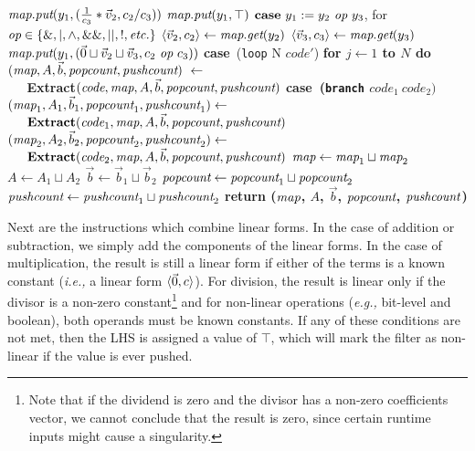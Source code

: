\documentclass{sig-alternate}
\begin{document}
\begin{algorithm}
\begin{algorithmic}
\IND
\STATE $\mbox{\it map}.\mbox{\it put}(y_1, (\frac{1}{c_3}*\vec v_2, c_2/c_3))$
\UND
{}
\IND
\STATE $\mbox{\it map}.\mbox{\it put}(y_1, \top)$
\UND
\UND
\STATE \vspace{-6pt}
\STATE $\mbox{\bf case}~y_1 := y_2 ~\mbox{\it op}~ y_3$, for $\mbox{\it op} \in \{\&, |, \wedge, \&\&, ||, !, \mbox{\it etc.}\}$
\IND
\STATE $\langle{\vec v_2}, {c_2}\rangle \leftarrow \mbox{\it map}.\mbox{\it get}(y_2)$
\STATE $\langle{\vec v_3}, {c_3}\rangle \leftarrow \mbox{\it map}.\mbox{\it get}(y_3)$
\STATE $\mbox{\it map}.\mbox{\it put}(y_1, (\vec 0 \sqcup \vec v_2 \sqcup \vec v_3, c_2 ~\mbox{\it op}~ c_3))$
\UND
\STATE \vspace{-6pt}
\STATE \mbox{\bf case}~({\tt loop} N $code'$)
\IND
\STATE \bf{for} $j \leftarrow 1$ to $N$ {\bf do}
\IND
\STATE $(\mbox{\it map}, A, {\vec b}, \mbox{\it popcount}, \mbox{\it pushcount})~\leftarrow~$ \\
\verb+   +\bf{Extract}$(\mbox{\it code}, \mbox{\it map}, A, {\vec b}, \mbox{\it popcount}, \mbox{\it pushcount})$
\UND
\UND
\STATE \vspace{-6pt}
\STATE \mbox{\bf case}~({\tt branch} $code_1~code_2)$
\IND
\STATE $(\mbox{\it map}_1, A_1, {\vec b_1}, \mbox{\it popcount}_1, \mbox{\it pushcount}_1) \leftarrow$ \\
\verb+   +${\mbox{\bf Extract}}(\mbox{\it code}_1, \mbox{\it map}, A, {\vec b}, \mbox{\it popcount}, \mbox{\it pushcount})$
\STATE $(\mbox{\it map}_2, A_2, {\vec b_2}, \mbox{\it popcount}_2, \mbox{\it pushcount}_2) \leftarrow$ \\ 
\verb+   +${\mbox{\bf Extract}}(\mbox{\it code}_2, \mbox{\it map}, A, {\vec b}, \mbox{\it popcount}, \mbox{\it pushcount})$
\STATE $\mbox{\it map} \leftarrow \mbox{\it map}_1 \sqcup \mbox{\it map}_2$
\STATE $A \leftarrow A_1 \sqcup A_2$
\STATE ${\vec b} \leftarrow {\vec b_1} \sqcup {\vec b_2}$
\STATE $\mbox{\it popcount} \leftarrow \mbox{\it popcount}_1 \sqcup \mbox{\it popcount}_2$
\STATE $\mbox{\it pushcount} \leftarrow \mbox{\it pushcount}_1 \sqcup \mbox{\it pushcount}_2$
\UND
\UND %
\ENDFOR
\STATE return ($\mbox{\it map}$, $A$, ${\vec b}$, $\mbox{\it popcount}$, $\mbox{\it pushcount}$)
\end{algorithmic}
\end{algorithm}

Next are the instructions which combine linear forms.  In the case of
addition or subtraction, we simply add the components of the linear
forms.  In the case of multiplication, the result is still a linear
form if either of the terms is a known constant ({\it i.e.,} a linear
form $\langle{\vec 0}, {c}\rangle$).  For division, the result is linear only if
the divisor is a non-zero constant\footnote{{\small Note that if the
dividend is zero and the divisor has a non-zero coefficients vector,
we cannot conclude that the result is zero, since certain runtime
inputs might cause a singularity.}} and for non-linear operations
({\it e.g.,} bit-level and boolean), both operands must be known
constants.  If any of these conditions are not met, then the LHS is
assigned a value of $\top$, which will mark the filter as non-linear
if the value is ever pushed.
\end{document}
